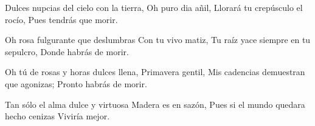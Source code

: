 \startlanguage[es]
\startlines
Dulces nupcias del cielo con la tierra,
Oh puro dia añil,
Llorará tu crepúsculo el rocío,
Pues tendrás que morir.

Oh rosa fulgurante que deslumbras
Con tu vivo matiz,
Tu raíz yace siempre en tu sepulcro,
Donde habrás de morir.

Oh tú de rosas y horas dulces llena,
Primavera gentil,
Mis cadencias demuestran que agonizas;
Pronto habrás de morir.

Tan sólo el alma dulce y virtuosa
Madera es en sazón,
Pues si el mundo quedara hecho cenizas
Viviría mejor.
\stoplines
\stoplanguage
